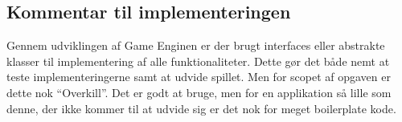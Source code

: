 



\subsection{Kommentar til implementeringen}

Gennem udviklingen af Game Enginen er der brugt interfaces eller abstrakte 
klasser til implementering af alle funktionaliteter. Dette gør det både nemt
at teste implementeringerne samt at udvide spillet. Men for scopet af opgaven
er dette nok ``Overkill''. Det er godt at bruge, men for en applikation så 
lille som denne, der ikke kommer til at udvide sig er det nok for meget 
boilerplate kode. 




